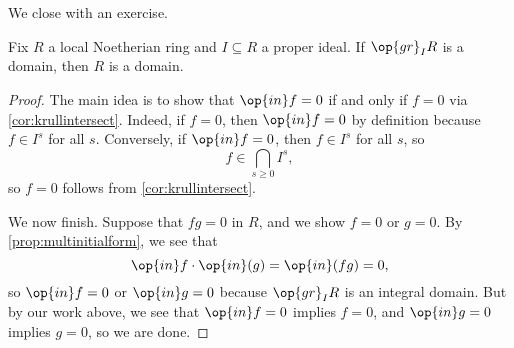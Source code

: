 We close with an exercise.
\begin{exe}
	Fix $R$ a local Noetherian ring and $I\subseteq R$ a proper ideal. If $\op{gr}_IR$ is a domain, then $R$ is a domain.
\end{exe}
\begin{proof}
	The main idea is to show that $\op{in}f=0$ if and only if $f=0$ via \autoref{cor:krullintersect}. Indeed, if $f=0$, then $\op{in}f=0$ by definition because $f\in I^s$ for all $s$. Conversely, if $\op{in}f=0$, then $f\in I^s$ for all $s$, so
	\[f\in\bigcap_{s\ge0}I^s,\]
	so $f=0$ follows from \autoref{cor:krullintersect}.

	We now finish. Suppose that $fg=0$ in $R$, and we show $f=0$ or $g=0$. By \autoref{prop:multinitialform}, we see that
	\[\op{in}f\cdot\op{in}(g)=\op{in}(fg)=0,\]
	so $\op{in}f=0$ or $\op{in}g=0$ because $\op{gr}_IR$ is an integral domain. But by our work above, we see that $\op{in}f=0$ implies $f=0$, and $\op{in}g=0$ implies $g=0$, so we are done.
\end{proof}
